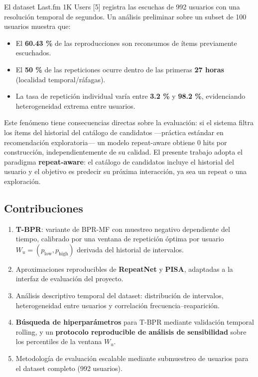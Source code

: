 \documentclass{article}
\providecommand{\tightlist}{%
  \setlength{\itemsep}{0pt}\setlength{\parskip}{0pt}}
\begin{document}
El dataset Last.fm 1K Users {[}5{]} registra las escuchas de 992 usuarios con una resolución temporal de segundos. Un análisis preliminar sobre un subset de 100 usuarios muestra que:

\begin{itemize}
\tightlist
\item
  El \textbf{60.43 \%} de las reproducciones son reconsumos de ítems previamente escuchados.
\item
  El \textbf{50 \%} de las repeticiones ocurre dentro de las primeras \textbf{27 horas} (localidad temporal/ráfagas).
\item
  La tasa de repetición individual varía entre \textbf{3.2 \%} y \textbf{98.2 \%}, evidenciando heterogeneidad extrema entre usuarios.
\end{itemize}

Este fenómeno tiene consecuencias directas sobre la evaluación: si el sistema filtra los ítems del historial del catálogo de candidatos ---práctica estándar en recomendación exploratoria--- un modelo repeat-aware obtiene 0 hits por construcción, independientemente de su calidad. El presente trabajo adopta el paradigma \textbf{repeat-aware}: el catálogo de candidatos incluye el historial del usuario y el objetivo es predecir su próxima interacción, ya sea un repeat o una exploración.

\subsection{Contribuciones}\label{contribuciones}

\begin{enumerate}
\def\labelenumi{\arabic{enumi}.}
\tightlist
\item
  \textbf{T-BPR}: variante de BPR-MF con muestreo negativo dependiente del tiempo, calibrado por una ventana de repetición óptima por usuario \(W_u = (p_{\text{low}}, p_{\text{high}})\) derivada del historial de intervalos.
\item
  Aproximaciones reproducibles de \textbf{RepeatNet} y \textbf{PISA}, adaptadas a la interfaz de evaluación del proyecto.
\item
  Análisis descriptivo temporal del dataset: distribución de intervalos, heterogeneidad entre usuarios y correlación frecuencia--reaparición.
\item
  \textbf{Búsqueda de hiperparámetros} para T-BPR mediante validación temporal rolling, y un \textbf{protocolo reproducible de análisis de sensibilidad} sobre los percentiles de la ventana \(W_u\).
\item
  Metodología de evaluación escalable mediante submuestreo de usuarios para el dataset completo (992 usuarios).
\end{enumerate}
\end{document}
